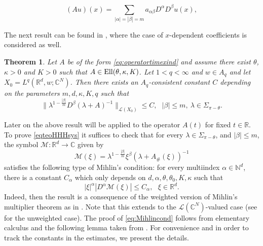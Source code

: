 \documentclass{amsart}
\theoremstyle{plain}
\newtheorem{theorem}{Theorem}[section]
\theoremstyle{remark}
\theoremstyle{plain}
\numberwithin{equation}{section}
\begin{document}
\begin{equation}\label{eq:operatortimexind}
(A u)(x) = \sum_{|\alpha| = |\beta|=m}  a_{\alpha\beta}D^{\alpha} D^\beta u(x),
\end{equation}

The next result can be found in \cite[Theorem 3.1]{HHH}, where the case of $x$-dependent coefficients is considered as well.
\begin{theorem}\label{teoHHHsys}
Let $A$ be of the form \eqref{eq:operatortimexind} and assume there exist
$\theta$, $\kappa>0$ and $K>0$ such that $A \in {\rm Ell}(\theta,\kappa,K)$.
Let $1<q<\infty$ and $w\in A_q$ and let $X_0 = L^q({ \mathbb{R} }^d,w;{ \mathbb{C} }^N)$.
Then there exists an $A_{q}$-consistent constant $C$ depending on the parameters $m,d,\kappa,K,q$ such that
\begin{equation}\label{eqteoHHHsys}
\|\lambda^{1-\frac{|\beta|}{m}}D^{\beta}(\lambda+A)^{-1}\|_{{{\mathscr L}}(X_0)}\leq C,\ \ \ |\beta|\leq m,\ \lambda\in\Sigma_{\pi-\theta}.
\end{equation}
\end{theorem}
Later on the above result will be applied to the operator $A(t)$ for fixed $t\in { \mathbb{R} }$.
To prove \eqref{eqteoHHHsys} it suffices to check that for every $\lambda\in \Sigma_{\pi-\theta}$, and $|\beta|\leq m$, the symbol $\mathcal{M}:{ \mathbb{R} }^d\to { \mathbb{C} }$ given by
\[\mathcal{M}(\xi) = \lambda^{1-\frac{|\beta|}{m}} \xi^{\beta} (\lambda+A_{\#}(\xi))^{-1}\]
satisfies the following type of Mihlin's condition: for every multiindex $\alpha\in { \mathbb{N} }^d$,  there is a constant $C_{\alpha}$ which only depends on
$d, \alpha, \theta,\theta_0, K, \kappa$ such that
\begin{equation}\label{eq:Mihlincond}
|\xi|^{\alpha} |D^{\alpha} \mathcal{M}(\xi)| \leq C_{\alpha}, \ \ \ \xi\in { \mathbb{R} }^d.
\end{equation}
Indeed, then the result is a consequence of the weighted version of Mihlin's multiplier theorem as in \cite[Theorem IV.3.9]{GarciaRubio}. Note  that this extends to the ${{\mathscr L}}({ \mathbb{C} }^N)$-valued case (see \cite[Theorem 6.1.6]{BergLof} for the unweighted case). The proof of \eqref{eq:Mihlincond} follows from elementary calculus and the following lemma taken from \cite[Proposition 3.1]{DuongSimonett}. For convenience and in order to track the constants in the estimates, we present the details.
\end{document}
